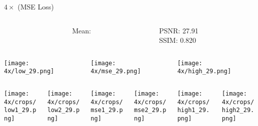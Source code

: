\documentclass[xcolor={dvipsnames}]{beamer}
\newcommand{\skipbutton}[2]{\hyperlink{#1}{\beamerbutton{#2}}}
\begin{document}
\begin{frame}{\(4\times\) (MSE Loss)}\label{frame:mse_4}
	\begin{columns}
		\begin{column}{0.5\textwidth}
			
		\end{column}
		\begin{column}{0.1\textwidth}
			Mean:\\\phantom{Hallo}
		\end{column}
		\begin{column}{0.4\textwidth}
			PSNR: 27.91 \\
			SSIM: 0.820
		\end{column}
	\end{columns}
	\begin{columns}
		\begin{column}{0.3\linewidth}
			\texttt{[image: 4x/low\_29.png]}
			\begin{columns}
				\begin{column}{0.5\linewidth}
					\texttt{[image: 4x/crops/low1\_29.png]}
				\end{column}
				\begin{column}{0.5\linewidth}
					\texttt{[image: 4x/crops/low2\_29.png]}
				\end{column}
			\end{columns}
		\end{column}
		\begin{column}{0.3\textwidth}
			\texttt{[image: 4x/mse\_29.png]}
			\begin{columns}
				\begin{column}{0.5\linewidth}
					\texttt{[image: 4x/crops/mse1\_29.png]}
				\end{column}
				\begin{column}{0.5\linewidth}
					\texttt{[image: 4x/crops/mse2\_29.png]}
				\end{column}
			\end{columns}
		\end{column}
		\begin{column}{0.3\textwidth}
			\texttt{[image: 4x/high\_29.png]}
			\begin{columns}
				\begin{column}{0.5\linewidth}
					\texttt{[image: 4x/crops/high1\_29.png]}
				\end{column}
				\begin{column}{0.5\linewidth}
					\texttt{[image: 4x/crops/high2\_29.png]}
				\end{column}
			\end{columns}
		\end{column}
	\end{columns}
	
	\hfill
	\skipbutton{frame:overview}{Overview}
\end{frame}
\end{document}
